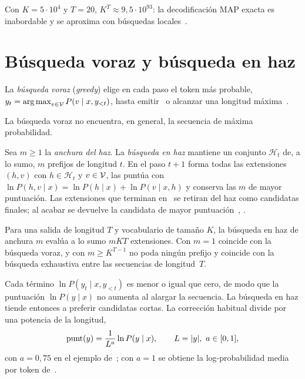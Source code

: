 Con $K=5\cdot 10^{4}$ y $T=20$, $K^{T}\approx 9{,}5\cdot 10^{93}$: la decodificación MAP exacta es inabordable y se aproxima con búsquedas locales~\cite[§10.8.2]{d2l}.

\section{Búsqueda voraz y búsqueda en haz}

\begin{definicion}
La \emph{búsqueda voraz} (\emph{greedy}) elige en cada paso el token más probable, $y_t=\operatorname*{arg\,max}_{v\in\mathcal{V}}P(v\mid x,y_{<t})$, hasta emitir \fin\ o alcanzar una longitud máxima~\cite[§7.6.1]{jm3}.
\end{definicion}

\begin{proposicion}\label{prop:voraz-no-optima}
La búsqueda voraz no encuentra, en general, la secuencia de máxima probabilidad.
\end{proposicion}

\begin{definicion}\label{def:haz}
Sea $m\ge 1$ la \emph{anchura del haz}. La \emph{búsqueda en haz} mantiene un conjunto $\mathcal{H}_t$ de, a lo sumo, $m$ prefijos de longitud $t$. En el paso $t+1$ forma todas las extensiones $(h,v)$ con $h\in\mathcal{H}_t$ y $v\in\mathcal{V}$, las puntúa con $\ln P(h,v\mid x)=\ln P(h\mid x)+\ln P(v\mid x,h)$ y conserva las $m$ de mayor puntuación. Las extensiones que terminan en \fin\ se retiran del haz como candidatas finales; al acabar se devuelve la candidata de mayor puntuación~\cite[§13.4]{jm3}, \cite[§10.8.3]{d2l}.
\end{definicion}

\addtocounter{figure}{1}%

\begin{proposicion}\label{prop:coste-haz}
Para una salida de longitud $T$ y vocabulario de tamaño $K$, la búsqueda en haz de anchura $m$ evalúa a lo sumo $mKT$ extensiones. Con $m=1$ coincide con la búsqueda voraz, y con $m\ge K^{T-1}$ no poda ningún prefijo y coincide con la búsqueda exhaustiva entre las secuencias de longitud~$T$.
\end{proposicion}

\begin{observacion}\label{obs:longitud}
Cada término $\ln P(y_t\mid x,y_{<t})$ es menor o igual que cero, de modo que la puntuación $\ln P(y\mid x)$ no aumenta al alargar la secuencia. La búsqueda en haz tiende entonces a preferir candidatas cortas. La corrección habitual divide por una potencia de la longitud,
\[
\mathrm{punt}(y)=\frac{1}{L^{a}}\ln P(y\mid x),\qquad L=\lvert y\rvert,\ a\in[0,1],
\]
con $a=0{,}75$ en el ejemplo de~\cite[§10.8.3]{d2l}; con $a=1$ se obtiene la log-probabilidad media por token de~\cite[§13.4]{jm3}.
\end{observacion}

